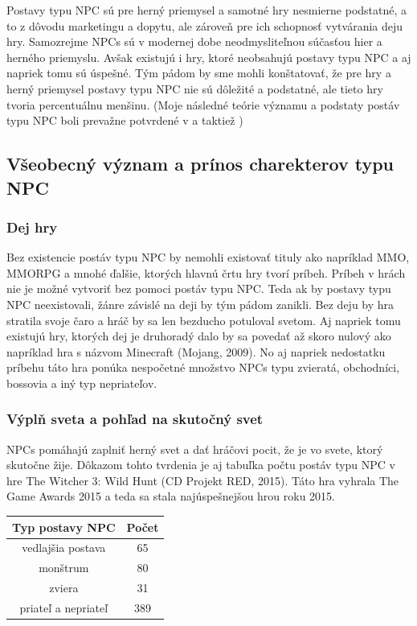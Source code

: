\documentclass[10pt,twoside,slovak,a4paper]{article}
\begin{document}
Postavy typu NPC sú pre herný priemysel a samotné hry nesmierne podstatné, a to z dôvodu marketingu a dopytu, ale zároveň pre ich schopnosť vytvárania deju hry. Samozrejme NPCs sú v modernej dobe neodmysliteľnou súčasťou hier a herného priemyslu. Avšak existujú i hry, ktoré neobsahujú postavy typu NPC a aj napriek tomu sú úspešné. Tým pádom by sme mohli konštatovať, že pre hry a herný priemysel postavy typu NPC nie sú dôležité a podstatné, ale tieto hry tvoria percentuálnu menšinu. (Moje následné teórie významu a podstaty postáv typu NPC boli prevažne potvrdené v \cite{9291553} a taktiež \cite{phdthesis})  

\subsection{Všeobecný význam a prínos charekterov typu NPC}

\subsubsection{Dej hry}
Bez existencie postáv typu NPC by nemohli existovať tituly ako napríklad MMO, MMORPG a 
mnohé ďalšie, 
ktorých hlavnú črtu hry tvorí príbeh. Príbeh v hrách nie je možné vytvoriť bez pomoci 
postáv typu NPC. 
Teda ak by postavy typu NPC neexistovali, žánre závislé na deji by tým pádom zanikli. 
Bez deju by hra stratila svoje čaro a hráč by sa len bezducho potuloval svetom. 
Aj napriek tomu 
existujú hry, ktorých dej je druhoradý dalo by sa povedať až skoro nulový ako 
napríklad hra s názvom Minecraft (Mojang, 2009). No aj napriek nedostatku príbehu 
táto hra ponúka nespočetné množstvo NPCs typu zvieratá, obchodníci, 
bossovia a iný typ nepriateľov.

\subsubsection{Výplň sveta a pohľad na skutočný svet}
NPCs pomáhajú zaplniť herný svet a dať hráčovi pocit, že je vo svete, ktorý
skutočne žije. Dôkazom tohto tvrdenia je aj tabuľka počtu postáv typu NPC v hre The Witcher 3: Wild Hunt (CD Projekt RED, 2015). Táto hra vyhrala The Game Awards 2015 a teda sa stala najúspešnejšou hrou roku 2015. 


\begin{center}

\hfill \break
    
\begin{tabular}{|c|c|}
    
     \hline
     Typ postavy NPC & Počet\\
     \hline
     vedlajšia postava & 65\\
    \hline
    monštrum & 80\\
    \hline
    zviera & 31\\
    \hline
    priateľ a nepriateľ &389\\
    \hline

\end{tabular}

\hfill \break

\end{center}
\end{document}
